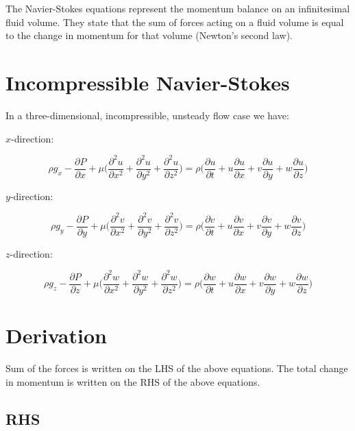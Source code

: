 The Navier-Stokes equations represent the momentum balance on an infinitesimal fluid volume. They state that the sum of forces acting on a fluid volume is equal to the change in momentum for that volume (Newton's second law).

\section{Incompressible Navier-Stokes}

In a three-dimensional, incompressible, unsteady flow case we have:

$x$-direction:

\begin{equation}
\rho g_x - \frac{\partial P}{\partial x} + \mu \Big( \frac{\partial^2 u}{\partial x^2} + \frac{\partial^2 u}{\partial y^2} + \frac{\partial^2 u}{\partial z^2}\Big) = \rho \Big( \frac{\partial u}{\partial t} + u \frac{\partial u}{\partial x} + v \frac{\partial u}{\partial y} + w \frac{\partial u}{\partial z} \Big)
\end{equation}

$y$-direction:

\begin{equation}
\rho g_y - \frac{\partial P}{\partial y} + \mu \Big( \frac{\partial^2 v}{\partial x^2} + \frac{\partial^2 v}{\partial y^2} + \frac{\partial^2 v}{\partial z^2}\Big) = \rho \Big( \frac{\partial v}{\partial t} + u \frac{\partial v}{\partial x} + v \frac{\partial v}{\partial y} + w \frac{\partial v}{\partial z} \Big)
\end{equation}

$z$-direction:

\begin{equation}
\rho g_z - \frac{\partial P}{\partial z} + \mu \Big( \frac{\partial^2 w}{\partial x^2} + \frac{\partial^2 w}{\partial y^2} + \frac{\partial^2 w}{\partial z^2}\Big) = \rho \Big( \frac{\partial w}{\partial t} + u \frac{\partial w}{\partial x} + v \frac{\partial w}{\partial y} + w \frac{\partial w}{\partial z} \Big)
\end{equation}

\section{Derivation}

Sum of the forces is written on the LHS of the above equations. The total change in momentum is written on the RHS of the above equations.

\subsection{RHS}

